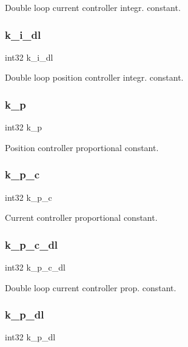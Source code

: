 Double loop current controller integr. constant. \mbox{\label{structst__motor_ab5c86695ff730d3387a8c6b089945a7e}} 
\subsubsection{k\+\_\+i\+\_\+dl}
{\footnotesize\ttfamily int32 k\+\_\+i\+\_\+dl}

Double loop position controller integr. constant. \mbox{\label{structst__motor_ad1bc394122aa9760c3fc2887a1891cd8}} 
\subsubsection{k\+\_\+p}
{\footnotesize\ttfamily int32 k\+\_\+p}

Position controller proportional constant. \mbox{\label{structst__motor_ac3311db4a733f35aa5ed2672cb162f96}} 
\subsubsection{k\+\_\+p\+\_\+c}
{\footnotesize\ttfamily int32 k\+\_\+p\+\_\+c}

Current controller proportional constant. \mbox{\label{structst__motor_a63c3f3c01d6757cafdb40043adce404e}} 
\subsubsection{k\+\_\+p\+\_\+c\+\_\+dl}
{\footnotesize\ttfamily int32 k\+\_\+p\+\_\+c\+\_\+dl}

Double loop current controller prop. constant. \mbox{\label{structst__motor_a047226f308f4365d9d0036d71b6ed910}} 
\subsubsection{k\+\_\+p\+\_\+dl}
{\footnotesize\ttfamily int32 k\+\_\+p\+\_\+dl}

